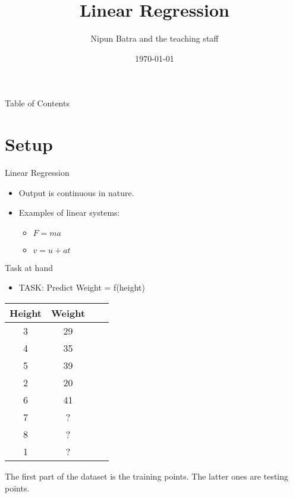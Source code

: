 \documentclass{beamer}
\title{Linear Regression}
\date{\today}
\author{Nipun Batra and the teaching staff}
\institute{IIT Gandhinagar}
\begin{document}
\maketitle

\begin{frame}{Table of Contents}
\tableofcontents
\end{frame}

\section{Setup}
  

\begin{frame}{Linear Regression}
\begin{itemize}
	
	
	\item<+-> Output is continuous in nature.
	\item<+-> Examples of linear systems:
	\begin{itemize}
		\item<+-> $F=ma$
		\item<+-> $v=u+at$
	\end{itemize}
	
\end{itemize}
\end{frame}

\begin{frame}{Task at hand}
\begin{itemize}

\item TASK: Predict Weight = f(height)
\end{itemize}
\begin{center}
    

\begin{tabular}{ |c|c|c|c| } 
\hline
 Height & Weight \\
\hline
3 & 29 \\ 
4 & 35 \\ 
5 & 39\\
2 & 20\\
6 & 41\\
\hline
\hline
7 & ?\\
8 & ?\\
1 &? \\
\hline
\end{tabular}

\end{center}
The first part of the dataset is the training points. The latter ones are testing points.	

\end{frame}
\end{document}
